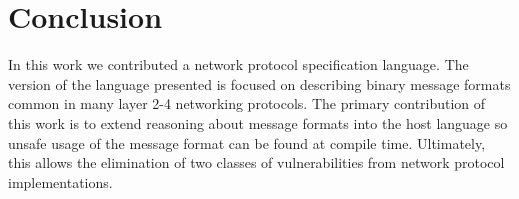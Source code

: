 \section{Conclusion}

In this work we contributed a network protocol specification language. The
version of the language presented is focused on describing binary message
formats common in many layer 2-4 networking protocols. The primary contribution
of this work is to extend reasoning about message formats into the host language
so unsafe usage of the message format can be found at compile time. Ultimately,
this allows the elimination of two classes of vulnerabilities from network
protocol implementations.

